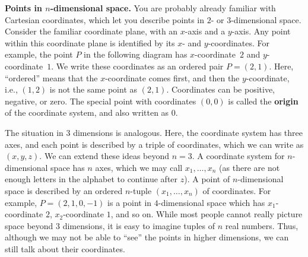 \noindent\textbf{Points in $n$-dimensional space.}
You are probably already familiar with Cartesian
coordinates, which let you describe
points in $2$- or $3$-dimensional space. Consider the
familiar coordinate plane, with an $x$-axis and a $y$-axis. Any point
within this coordinate plane is identified by its $x$- and
$y$-coordinates. For example, the point
$P$ in the following diagram has $x$-coordinate~$2$ and
$y$-coordinate~$1$.  We write these coordinates as an ordered pair
$P=(2,1)$. Here, ``ordered'' means that the $x$-coordinate comes
first, and then the $y$-coordinate, i.e., $(1,2)$ is not the same
point as $(2,1)$. Coordinates can be positive, negative, or zero. The
special point with coordinates $(0,0)$ is called the
\textbf{origin} of the coordinate system, and also
written as $0$.
\begin{center}
\end{center}
The situation in $3$ dimensions is analogous. Here, the coordinate
system has three axes, and each point is described by a triple of
coordinates, which we can write as $(x,y,z)$.  We can extend these
ideas beyond $n=3$. A coordinate system for $n$-dimensional space has
$n$ axes, which we may call $x_1,\ldots,x_n$ (as there are not enough
letters in the alphabet to continue after $z$). A point of
$n$-dimensional space is described by an ordered $n$-tuple
$(x_1,\ldots,x_n)$ of coordinates. For example, $P=(2,1,0,-1)$ is a
point in $4$-dimensional space which has $x_1$-coordinate $2$,
$x_2$-coordinate $1$, and so on. While most people cannot really
picture space beyond $3$ dimensions, it is easy to imagine tuples of
$n$ real numbers. Thus, although we may not be able to ``see'' the
points in higher dimensions, we can still talk about their coordinates.
\bigskip

